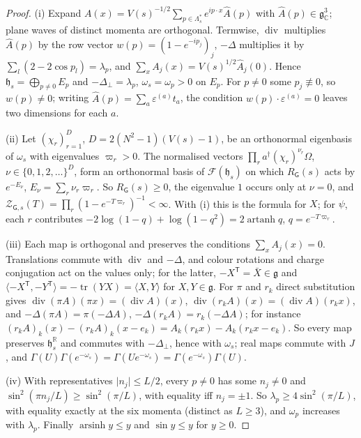 \documentclass[11pt,a4paper]{amsart}
\theoremstyle{definition}
\theoremstyle{remark}
\numberwithin{equation}{section}
\DeclareMathOperator{\tr}{tr}        %
\newcommand{\R}{\mathbb{R}}          %
\newcommand{\C}{\mathbb{C}}          %
\newcommand{\ip}[2]{\langle #1,#2\rangle}  %
\newcommand{\abs}[1]{\lvert #1\rvert}      %
\newcommand{\TT}{\mathbb{T}}               %
\newcommand{\Zc}{\mathcal{Z}}              %
\newcommand{\Zs}[2]{\Zc_{#1}(#2)}          %
\newcommand{\Vol}[1]{V(#1)}                %
\newcommand{\Gharm}{\mathsf{G}}            %
\begin{document}
\begin{proof}
(i) Expand $A(x)=\Vol{s}^{-1/2}\sum_{p\in\Lambda_s^*}e^{ip\cdot x}\hat A(p)$ with $\hat A(p)\in\mathfrak g_\C^3$; plane waves of distinct momenta are orthogonal. Termwise, $\operatorname{div}$ multiplies $\hat A(p)$ by the row vector $w(p)=(1-e^{-ip_j})_j$, $-\Delta$ multiplies it by $\sum_l(2-2\cos p_l)=\lambda_p$, and $\sum_xA_j(x)=\Vol{s}^{1/2}\hat A_j(0)$. Hence $\mathfrak h_s=\bigoplus_{p\ne0}E_p$ and $-\Delta_\perp=\lambda_p$, $\omega_s=\omega_p>0$ on $E_p$. For $p\ne0$ some $p_j\not\equiv0$, so $w(p)\ne0$; writing $\hat A(p)=\sum_a\varepsilon^{(a)}t_a$, the condition $w(p)\cdot\varepsilon^{(a)}=0$ leaves two dimensions for each $a$.

(ii) Let $(\chi_r)_{r=1}^D$, $D=2(N^2-1)(\Vol{s}-1)$, be an orthonormal eigenbasis of $\omega_s$ with eigenvalues $\varpi_r>0$. The normalised vectors $\prod_ra^\dagger(\chi_r)^{\nu_r}\Omega$, $\nu\in\{0,1,2,\dots\}^D$, form an orthonormal basis of $\mathcal F(\mathfrak h_s)$ on which $R_{\Gharm}(s)$ acts by $e^{-E_\nu}$, $E_\nu=\sum_r\nu_r\varpi_r$. So $R_{\Gharm}(s)\ge0$, the eigenvalue $1$ occurs only at $\nu=0$, and $\Zs{\Gharm,s}{T}=\prod_r(1-e^{-T\varpi_r})^{-1}<\infty$. With (i) this is the formula for $X$; for $\psi$, each $r$ contributes $-2\log(1-q)+\log(1-q^2)=2\operatorname{artanh}q$, $q=e^{-T\varpi_r}$.

(iii) Each map is orthogonal and preserves the conditions $\sum_xA_j(x)=0$. Translations commute with $\operatorname{div}$ and $-\Delta$, and colour rotations and charge conjugation act on the values only; for the latter, $-X^{\mathsf T}=\bar X\in\mathfrak g$ and $\ip{-X^{\mathsf T}}{-Y^{\mathsf T}}=-\tr(YX)=\ip{X}{Y}$ for $X,Y\in\mathfrak g$. For $\pi$ and $r_k$ direct substitution gives $\operatorname{div}(\pi A)(\pi x)=(\operatorname{div}A)(x)$, $\operatorname{div}(r_kA)(x)=(\operatorname{div}A)(r_kx)$, and $-\Delta(\pi A)=\pi(-\Delta A)$, $-\Delta(r_kA)=r_k(-\Delta A)$; for instance $(r_kA)_k(x)-(r_kA)_k(x-e_k)=A_k(r_kx)-A_k(r_kx-e_k)$. So every map preserves $\mathfrak h^{\R}_s$ and commutes with $-\Delta_\perp$, hence with $\omega_s$; real maps commute with $J$, and $\Gamma(U)\Gamma(e^{-\omega_s})=\Gamma(Ue^{-\omega_s})=\Gamma(e^{-\omega_s})\Gamma(U)$.

(iv) With representatives $\abs{n_j}\le L/2$, every $p\ne0$ has some $n_j\ne0$ and $\sin^2(\pi n_j/L)\ge\sin^2(\pi/L)$, with equality iff $n_j=\pm1$. So $\lambda_p\ge4\sin^2(\pi/L)$, with equality exactly at the six momenta (distinct as $L\ge3$), and $\omega_p$ increases with $\lambda_p$. Finally $\operatorname{arsinh}y\le y$ and $\sin y\le y$ for $y\ge0$.
\end{proof}
\end{document}
